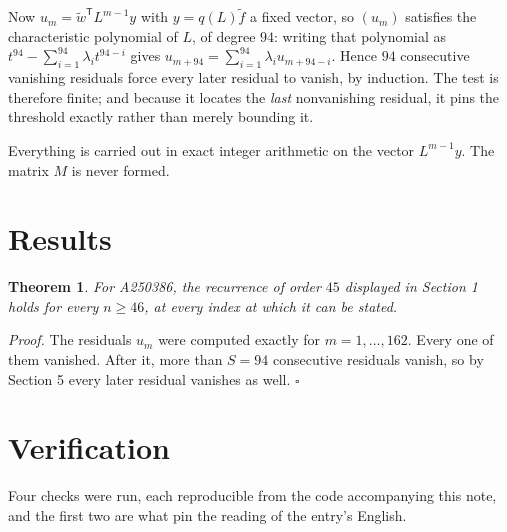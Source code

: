 \documentclass[11pt]{article}
\newtheorem{theorem}{Theorem}
\theoremstyle{definition}
\begin{document}
Now $u_m = \tilde w^{\mathsf T} L^{m-1} y$ with $y = q(L)\tilde f$ a fixed vector, so $(u_m)$ satisfies the characteristic polynomial of $L$, of degree $94$: writing that polynomial as $t^{94} - \sum_{i=1}^{94} \lambda_i t^{94-i}$ gives $u_{m+94} = \sum_{i=1}^{94} \lambda_i u_{m+94-i}$. Hence $94$ consecutive vanishing residuals force every later residual to vanish, by induction. The test is therefore finite; and because it locates the {\itshape last} nonvanishing residual, it pins the threshold exactly rather than merely bounding it.

Everything is carried out in exact integer arithmetic on the vector $L^{m-1}y$. The matrix $M$ is never formed.

\section{Results}

\begin{theorem} For A250386, the recurrence of order $45$ displayed in Section 1 holds for every $n \ge 46$, at every index at which it can be stated.\end{theorem}

{\itshape Proof.} The residuals $u_m$ were computed exactly for $m = 1,\dots,162$. Every one of them vanished. After it, more than $S = 94$ consecutive residuals vanish, so by Section 5 every later residual vanishes as well. $\square$

\section{Verification}

Four checks were run, each reproducible from the code accompanying this note, and the first two are what pin the reading of the entry's English.
\end{document}
